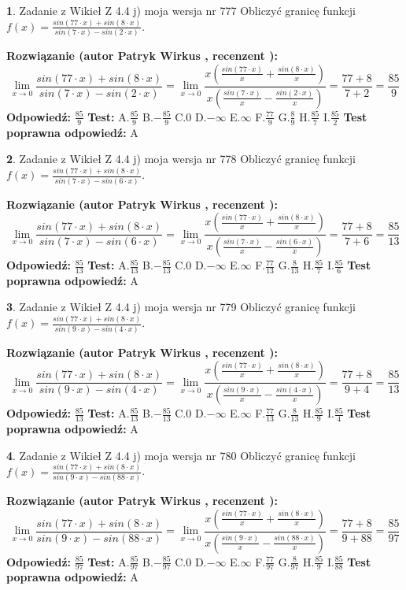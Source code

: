 \documentclass[12pt, a4paper]{article}
\theoremstyle{definition} %
\newtheorem{zad}{}
\newcommand{\zadStart}[1]{\begin{zad}#1\newline}
\newcommand{\zadStop}{\end{zad}}
\newcommand{\rozwStart}[2]{\noindent \textbf{Rozwiązanie (autor #1 , recenzent #2): }\newline}
\newcommand{\rozwStop}{\newline}
\newcommand{\odpStart}{\noindent \textbf{Odpowiedź:}\newline}
\newcommand{\odpStop}{\newline}
\newcommand{\testStart}{\noindent \textbf{Test:}\newline}
\newcommand{\testStop}{\newline}
\newcommand{\kluczStart}{\noindent \textbf{Test poprawna odpowiedź:}\newline}
\newcommand{\kluczStop}{\newline}
\begin{document}
\zadStart{Zadanie z Wikieł Z 4.4 j) moja wersja nr 777}
Obliczyć granicę funkcji $f(x)=\frac{sin(77\cdot x) +sin(8\cdot x)}{sin(7\cdot x) -sin(2\cdot x)}$.
\zadStop
\rozwStart{Patryk Wirkus}{}
$$\lim\limits_{x\to 0}\frac{sin(77\cdot x) +sin(8\cdot x)}{sin(7\cdot x) -sin(2\cdot x)}=\lim\limits_{x\to 0}\frac{x(\frac{sin(77\cdot x)}{x}+\frac{sin(8\cdot x)}{x})}{x(\frac{sin(7\cdot x)}{x}-\frac{sin(2\cdot x)}{x})}=\frac{77+8}{7+2} = \frac{85}{9}$$
\rozwStop
\odpStart
$\frac{85}{9}$
\odpStop
\testStart
A.$\frac{85}{9}$
B.$-\frac{85}{9}$
C.$0$
D.$-\infty$
E.$\infty$
F.$\frac{77}{9}$
G.$\frac{8}{9}$
H.$\frac{85}{7}$
I.$\frac{85}{2}$
\testStop
\kluczStart
A
\kluczStop



\zadStart{Zadanie z Wikieł Z 4.4 j) moja wersja nr 778}
Obliczyć granicę funkcji $f(x)=\frac{sin(77\cdot x) +sin(8\cdot x)}{sin(7\cdot x) -sin(6\cdot x)}$.
\zadStop
\rozwStart{Patryk Wirkus}{}
$$\lim\limits_{x\to 0}\frac{sin(77\cdot x) +sin(8\cdot x)}{sin(7\cdot x) -sin(6\cdot x)}=\lim\limits_{x\to 0}\frac{x(\frac{sin(77\cdot x)}{x}+\frac{sin(8\cdot x)}{x})}{x(\frac{sin(7\cdot x)}{x}-\frac{sin(6\cdot x)}{x})}=\frac{77+8}{7+6} = \frac{85}{13}$$
\rozwStop
\odpStart
$\frac{85}{13}$
\odpStop
\testStart
A.$\frac{85}{13}$
B.$-\frac{85}{13}$
C.$0$
D.$-\infty$
E.$\infty$
F.$\frac{77}{13}$
G.$\frac{8}{13}$
H.$\frac{85}{7}$
I.$\frac{85}{6}$
\testStop
\kluczStart
A
\kluczStop



\zadStart{Zadanie z Wikieł Z 4.4 j) moja wersja nr 779}
Obliczyć granicę funkcji $f(x)=\frac{sin(77\cdot x) +sin(8\cdot x)}{sin(9\cdot x) -sin(4\cdot x)}$.
\zadStop
\rozwStart{Patryk Wirkus}{}
$$\lim\limits_{x\to 0}\frac{sin(77\cdot x) +sin(8\cdot x)}{sin(9\cdot x) -sin(4\cdot x)}=\lim\limits_{x\to 0}\frac{x(\frac{sin(77\cdot x)}{x}+\frac{sin(8\cdot x)}{x})}{x(\frac{sin(9\cdot x)}{x}-\frac{sin(4\cdot x)}{x})}=\frac{77+8}{9+4} = \frac{85}{13}$$
\rozwStop
\odpStart
$\frac{85}{13}$
\odpStop
\testStart
A.$\frac{85}{13}$
B.$-\frac{85}{13}$
C.$0$
D.$-\infty$
E.$\infty$
F.$\frac{77}{13}$
G.$\frac{8}{13}$
H.$\frac{85}{9}$
I.$\frac{85}{4}$
\testStop
\kluczStart
A
\kluczStop



\zadStart{Zadanie z Wikieł Z 4.4 j) moja wersja nr 780}
Obliczyć granicę funkcji $f(x)=\frac{sin(77\cdot x) +sin(8\cdot x)}{sin(9\cdot x) -sin(88\cdot x)}$.
\zadStop
\rozwStart{Patryk Wirkus}{}
$$\lim\limits_{x\to 0}\frac{sin(77\cdot x) +sin(8\cdot x)}{sin(9\cdot x) -sin(88\cdot x)}=\lim\limits_{x\to 0}\frac{x(\frac{sin(77\cdot x)}{x}+\frac{sin(8\cdot x)}{x})}{x(\frac{sin(9\cdot x)}{x}-\frac{sin(88\cdot x)}{x})}=\frac{77+8}{9+88} = \frac{85}{97}$$
\rozwStop
\odpStart
$\frac{85}{97}$
\odpStop
\testStart
A.$\frac{85}{97}$
B.$-\frac{85}{97}$
C.$0$
D.$-\infty$
E.$\infty$
F.$\frac{77}{97}$
G.$\frac{8}{97}$
H.$\frac{85}{9}$
I.$\frac{85}{88}$
\testStop
\kluczStart
A
\kluczStop
\end{document}
